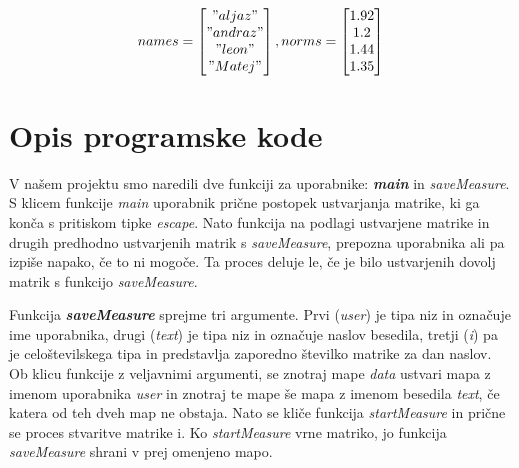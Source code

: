 \documentclass[12pt]{article}
\begin{document}
\[
  names = \begin{bmatrix}
    "aljaz"\\
    "andraz"\\
    "leon"\\
    "Matej"
  \end{bmatrix},
  norms = \begin{bmatrix}
    1.92\\
    1.2\\
    1.44\\
    1.35
  \end{bmatrix}
\]
\section{Opis programske kode}
V našem projektu smo naredili dve funkciji za uporabnike: \textbf{\textit{main}} in \textit{saveMeasure}. 
S klicem funkcije \textit{main} uporabnik prične postopek ustvarjanja matrike, ki ga konča s pritiskom 
tipke \textit{escape}. Nato funkcija na podlagi ustvarjene matrike in drugih predhodno ustvarjenih matrik s 
\textit{saveMeasure}, prepozna uporabnika ali pa izpiše napako, če to ni mogoče. Ta proces deluje le, če je bilo 
ustvarjenih dovolj matrik s funkcijo \textit{saveMeasure}.

Funkcija \textbf{\textit{saveMeasure}} sprejme tri argumente. 
Prvi (\textit{user}) je tipa niz in označuje ime uporabnika, drugi (\textit{text}) je tipa niz in označuje naslov 
besedila, tretji (\textit{i}) pa je celoštevilskega tipa in predstavlja zaporedno številko matrike za dan naslov. 
Ob klicu funkcije z veljavnimi argumenti, se znotraj mape \textit{data} ustvari mapa z imenom uporabnika \textit{user} 
in znotraj te mape še mapa z imenom besedila \textit{text}, če katera od teh dveh map ne obstaja. 
Nato se kliče funkcija \textit{startMeasure} in prične se proces stvaritve matrike i. Ko \textit{startMeasure} 
vrne matriko, jo funkcija\textit{ saveMeasure} shrani v prej omenjeno mapo.
\end{document}
